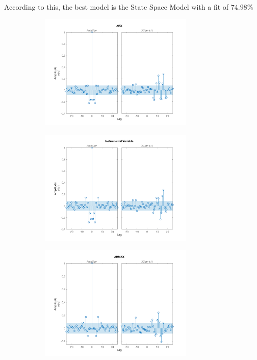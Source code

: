 \documentclass{scrartcl}
\begin{document}
According to this, the best model is the State Space Model with a fit of $74.98 \% $


\begin{figure}[h]
	\centering
	\begin{subfigure}{.49\textwidth}
		\includegraphics[height=5.5cm]{figures/v_arx.png}
		\label{fig:v_arx}
	\end{subfigure}\hfill
	\begin{subfigure}{.49\textwidth}
		\includegraphics[height=5.5cm]{figures/v_iv.png}
		\label{fig:v_iv4}
	\end{subfigure}
	\begin{subfigure}{.49\textwidth}
		\includegraphics[height=5.5cm]{figures/v_armax.png}
		\label{fig:v_armax}

\end{subfigure}
\end{figure}
\end{document}
